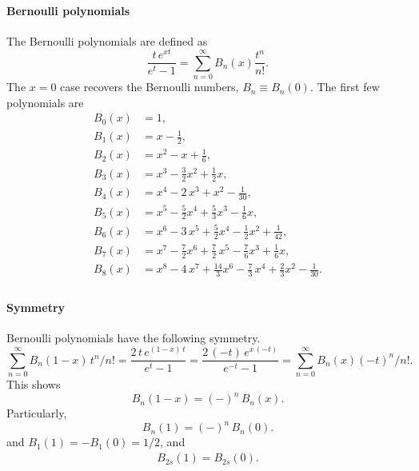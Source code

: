 \documentclass[aip,jcp,preprint,notitlepage, superscriptaddress]{revtex4-1}
\begin{document}
\paragraph{Bernoulli polynomials}



The Bernoulli polynomials are defined as
%
\begin{equation}
  \frac{ t \, e^{x t} }
  {e^t - 1}
=
\sum_{n = 0}^\infty
  B_n(x) \frac{ t^n } { n! }.
\label{eq:Bernoulli_polynomial}
\end{equation}
%
The $x = 0$ case
recovers the Bernoulli numbers,
$B_n \equiv B_n(0)$.
%
The first few polynomials are\cite{
  whittaker, arfken, abramowitz, wang_specfunc}
\begin{align*}
B_0(x) &= 1, \\
B_1(x) &= x - \frac 1 2, \\
B_2(x) &= x^2 - x + \frac 1 6, \\
B_3(x) &= x^3 - \frac 3 2 x^2 + \frac 1 2 x, \\
B_4(x) &= x^4 - 2 \, x^3 + x^2 - \frac{1}{30}, \\
B_5(x) &= x^5 - \frac 5 2 x^4 + \frac 5 3 x^3 - \frac{1}{6} x, \\
B_6(x) &= x^6 - 3 \, x^5 + \frac 5 2 x^4 - \frac 1 2 x^2 + \frac{1}{42}, \\
B_7(x) &= x^7 - \frac 7 2 x^6 + \frac 7 2 \, x^5 - \frac 7 6 x^3 + \frac 1 6 x, \\
B_8(x) &= x^8 - 4 \, x^7 + \frac{14} 3 x^6 - \frac 7 3 \, x^4 + \frac 2 3 x^2 - \frac{1}{30}. \\
\end{align*}




\paragraph{Symmetry}



Bernoulli polynomials have the following symmetry.
%
\begin{equation*}
\sum_{n = 0}^\infty
B_n(1 - x) \, t^n/n!
=
\frac{ 2 \, t \, e^{(1 - x) \, t} }
{ e^t - 1 }
=
\frac{ 2 \, (-t) \, e^{ x \, (-t)} }
{ e^{-t} - 1 }
=
\sum_{n = 0}^\infty
B_n(x) (-t)^n / n!.
\end{equation*}
%
This shows
\[
B_n(1 - x) = (-)^n \, B_n(x).
\]
Particularly,
\[
B_n(1) = (-)^n \, B_n(0).
\]
and $B_1(1) = -B_1(0) = 1/2$, and
\begin{align}
B_{2s}(1) = B_{2s}(0).
\label{eq:Bernoulli1_even}
\end{align}
\end{document}
